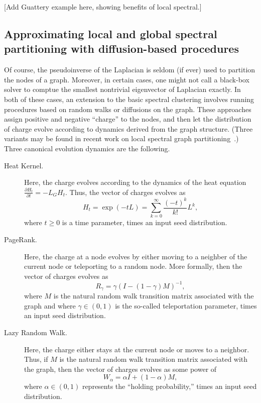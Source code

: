 \documentclass[12pt]{article}
\theoremstyle{plain}
\begin{document}
[Add Guattery example here, showing benefits of local spectral.]


\subsection{Approximating local and global spectral partitioning with 
diffusion-based procedures}

Of course, the pseudoinverse of the Laplacian is seldom (if ever) used to 
partition the nodes of a graph.
Moreover, in certain cases, one might not call a black-box solver to comptue 
the smallest nontrivial eigenvector of Laplacian exactly.
In both of these cases, an extension to the basic spectral clustering 
involves running procedures based on random walks or diffusions 
on the graph.  
These approaches assign positive and negative ``charge'' to the nodes,
and then let the distribution of charge evolve according to dynamics
derived from the graph structure.
(Three variants may be found in recent work on local spectral graph 
partitioning~\cite{Spielman:2004,andersen06local,Chung07_heatkernelPNAS}.)
Three canonical evolution dynamics are the following.
\begin{description}
  \item[Heat Kernel.]
    Here, the charge evolves according to the dynamics of the heat equation
    $\frac{\partial H_t}{\partial t} = - L_G H_t$.
    Thus, the vector of charges evolves as
    \begin{equation}
    \label{eqn:heat-kernel}
    H_t = \exp ( -tL )  = \sum_{k=0}^{\infty} \frac{(-t)^k}{k!}L^k  ,
    \end{equation}
    where $t \ge 0$ is a time parameter, times an input seed distribution.
  \item[PageRank.]
    Here, the charge at a node evolves by either moving to a neighber of 
    the current node or teleporting to a random node.
    More formally, then the vector of charges evolves as 
    \begin{equation}
    \label{eqn:page-rank}
    R_{\gamma} = \gamma \left(I-\left(1-\gamma \right)M \right)^{-1}   ,
    \end{equation}
    where $M$ is the natural random walk transition matrix associated 
    with the graph and
    where $\gamma \in (0,1)$ is the so-called teleportation parameter,
    times an input seed distribution.
  \item[Lazy Random Walk.]
    Here, the charge either stays at the current node or moves to a neighbor.
    Thus, if $M$ is the natural random walk transition matrix associated 
    with the graph, then the vector of charges evolves as some power of 
    \begin{equation}
    \label{eqn:lazy-walk}
    W_{\alpha}= \alpha I + (1-\alpha)M ,
    \end{equation}
    where $\alpha \in (0,1)$ represents the ``holding probability,'' times 
    an input seed distribution.
\end{description}
\end{document}
